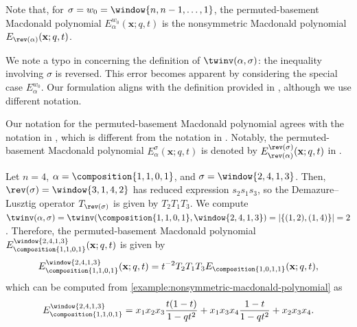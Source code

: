 Note that, for \(\sigma = w_0 = \window{n, n-1, \ldots, 1}\),
the permuted-basement Macdonald polynomial \(E_{\alpha}^{w_0}(\mathbf{x}; q, t)\)
is the nonsymmetric Macdonald polynomial \(E_{\rev(\alpha)}(\mathbf{x}; q, t)\).

\begin{remark}
	We note a typo in \cite{Ale19} concerning the definition of \(\twinv(\alpha, \sigma)\):
	the inequality involving \(\sigma\) is reversed.
	This error becomes apparent by considering the special case \(E_\alpha^{w_0}\).
	Our formulation aligns with the definition provided in \cite{Fer11},
	although we use different notation.
\end{remark}

\begin{remark}
	\label{remark:notation-permuted-basement-macdonald-polynomial-Ale19}
	Our notation for the permuted-basement Macdonald polynomial agrees with
	the notation in \cite{Ale19,CMW22},
	which is different from the notation in \cite{Fer11}.
	Notably, the permuted-basement Macdonald polynomial \(E_{\alpha}^{\sigma}(\mathbf{x}; q, t)\)
	is denoted by \(E_{\rev(\alpha)}^{\rev(\sigma)}(\mathbf{x};q,t)\) in \cite{Fer11}.
\end{remark}

\begin{example}
	\label{example:permuted-basement-macdonald-polynomial}
	Let \(n = 4\),
	\(\alpha = \composition{1, 1, 0, 1}\),
	and \(\sigma = \window{2, 4, 1, 3}\).
	Then, \(\rev(\sigma)=\window{3, 1, 4, 2}\) has reduced expression \(s_2 s_1 s_3\),
	so the Demazure--Lusztig operator \(T_{\rev(\sigma)}\) is given by \(T_2 T_1 T_3\).
	We compute
	\(
		\twinv(\alpha, \sigma) =
		\twinv(\composition{1, 1, 0, 1}, \window{2, 4, 1, 3}) =
		|\{(1, 2), (1, 4)\}| = 2
	\).
	Therefore,
	the permuted-basement Macdonald polynomial
	\(E_{\composition{1, 1, 0, 1}}^{\window{2, 4, 1, 3}}(\mathbf{x}; q, t)\)
	is given by
	\begin{equation*}
		E_{\composition{1, 1, 0, 1}}^{\window{2, 4, 1, 3}}(\mathbf{x}; q, t)
		=
		t^{-2}
		T_2 T_1 T_3
		E_{\composition{1, 0, 1, 1}}(\mathbf{x}; q, t),
	\end{equation*}
	which can be computed from \cref{example:nonsymmetric-macdonald-polynomial} as
	\begin{equation*}
		E_{\composition{1, 1, 0, 1}}^{\window{2, 4, 1, 3}}
		=
		x_{1} x_{2} x_{3} \frac{t(1 - t)}{1 - q t^2} +
		x_{1} x_{3} x_{4} \frac{1 - t}{1 - q t^2} +
		x_{2} x_{3} x_{4}.
	\end{equation*}
\end{example}

